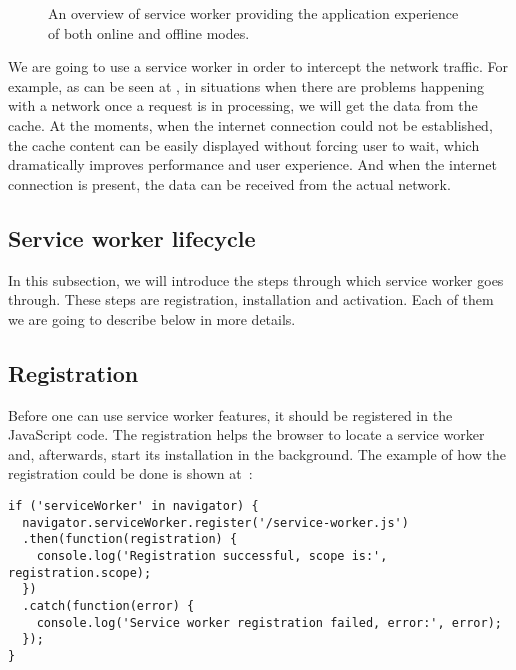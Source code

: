 \begin{figure}[!htb]
    \begin{center}
    \def\svgwidth{0.7\linewidth}
    
    \caption {An overview of service worker providing the application experience of both online and offline modes.}
    \label{fig:sw_interact}
\end{center}
\end{figure}

We are going to use a service worker in order to intercept the network traffic. For example, as can be seen at , in situations when there are problems happening with a network once a request is  in processing, we will get the data from the cache. At the moments, when the internet connection could not be established, the cache content can be easily displayed without forcing user to wait, which dramatically improves performance and user experience. And when the internet connection is present, the data can be received from the actual network. 

\subsection{Service worker lifecycle}

In this subsection, we will introduce the steps through which service worker goes through. These steps are registration, installation and activation. Each of them we are going to describe below in more details.

\subsection*{Registration}

Before one can use service worker features, it should be registered in the JavaScript code. The registration helps the browser to locate a service worker and, afterwards, start its installation in the background. The example of how the registration could be done is shown at~:

\begin{lstlisting}[caption={An example code, which demonstrates the registration of serivce worker.}, label={lst:tech1}]
if ('serviceWorker' in navigator) {
  navigator.serviceWorker.register('/service-worker.js')
  .then(function(registration) {
    console.log('Registration successful, scope is:', registration.scope);
  })
  .catch(function(error) {
    console.log('Service worker registration failed, error:', error);
  });
}
\end{lstlisting}


